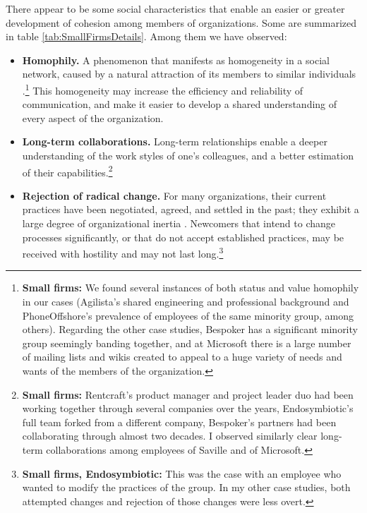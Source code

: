 There appear to be some social characteristics that enable an easier or greater development of cohesion among members of organizations. Some are summarized in table \ref{tab:SmallFirmsDetails}. Among them we have observed:

\begin{itemize}
\item \textbf{Homophily.} A phenomenon that manifests as homogeneity in a social network, caused by a natural attraction of its members to similar individuals \cite{McPherson2001}.\footnote{\textbf{Small firms:} We found several instances of both status and value homophily in our cases (Agilista's shared engineering and professional background and PhoneOffshore's prevalence of employees of the same minority group, among others). Regarding the other case studies, Bespoker has a significant minority group seemingly banding together, and at Microsoft there is a large number of mailing lists and wikis created to appeal to a huge variety of needs and wants of the members of the organization.} This homogeneity may increase the efficiency and reliability of communication, and make it easier to develop a shared understanding of every aspect of the organization.

\item \textbf{Long-term collaborations.} Long-term relationships enable a deeper understanding of the work styles of one's colleagues, and a better estimation of their capabilities.\footnote{\textbf{Small firms:} Rentcraft's product manager and project leader duo had been working together through several companies over the years, Endosymbiotic's full team forked from a different company, Bespoker's partners had been collaborating through almost two decades. I observed similarly clear long-term collaborations among employees of Saville and of Microsoft.}

\item \textbf{Rejection of radical change.} For many organizations, their current practices have been negotiated, agreed, and settled in the past; they exhibit a large degree of organizational inertia \cite{Hannan1989}. Newcomers that intend to change processes significantly, or that do not accept established practices, may be received with hostility and may not last long.\footnote{\textbf{Small firms, Endosymbiotic:} This was the case with an employee who wanted to modify the practices of the group. In my other case studies, both attempted changes and rejection of those changes were less overt.}
\end{itemize}

